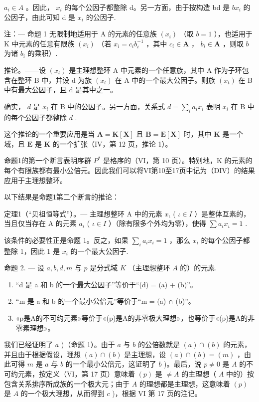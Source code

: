 \(a_{i} \in A\) 。因此， \(x_{i}\) 的每个公因子都整除 d。另一方面，由于按构造 bd 是 \(bx_{i}\) 的公因子，由此可知 d 是 \(x_{i}\) 的公因子.

注：--- 命题 1 无限制地适用于 A 的元素的任意族 \((x_{i})\) （取 \(b = 1\) ），也适用于 K 中元素的任意有限族 \((x_{i})\) （若 \(x_{i} = c_{i}b_{i}^{-1}\) ，其中 \(c_{i} \in \mathbf{A}\) ， \(b_{i} \in \mathbf{A}\) ，则取 \(b\) 为诸 \(b_{i}\) 的乘积）.

推论。——设 \((x_{t})\) 是主理想整环 A 中元素的一个任意族，其中 A 作为子环包含在整环 B 中，并设 d 为族 \((x_{t})\) 在 A 中的一个最大公因子。则族 \((x_{t})\) 在 B 中有最大公因子，且 d 是其中之一。

确实， \(d\) 是 \(x_{i}\) 在 B 中的公因子。另一方面，关系式 \(d = \sum_{i} a_{i} x_{i}\) 表明 \(x_{i}\) 在 B 中的每个公因子都整除 \(d\) .

这个推论的一个重要应用是当 \(\mathbf{A} = \mathbf{K}[\mathbf{X}]\) 且 \(\mathbf{B} = \mathbf{E}[\mathbf{X}]\) 时，其中 \(\mathbf{K}\) 是一个域，且 \(\mathbf{E}\) 是 \(\mathbf{K}\) 的一个扩张（IV，第 12 页，推论 1）。

命题1的第一个断言表明序群 \(P^{*}\) 是格序的（VI，第 10 页）。特别地，K 的元素的每个有限族都有最小公倍元。因此我们可以将VI第10至17页中记为（DIV）的结果应用于主理想整环。

以下结果是命题1第二个断言的推论：

定理1（“贝祖恒等式”）。--- 主理想整环 A 中的元素 \(x_{\iota}\) ( \(\iota \in I\) ）是整体互素的，当且仅当存在 A 的元素 \(a_{\iota}\) ( \(\iota \in I\) ）（除有限多个外均为零），使得 \(\sum a_{\iota}x_{\iota} = 1\) .

该条件的必要性正是命题 1。反之，如果 \(\sum_{i} a_i x_i = 1\) ，那么 \(x_i\) 的每个公因子都整除 1，因此 1 是 \(x_i\) 的一个最大公因子.

命题 2. --- 设 \(a, b, d, m\) 与 \(p\) 是分式域 \(K\) （主理想整环 \(A\) 的）的元素.

\begin{enumerate}
\def\labelenumi{\alph{enumi})}
\item
  “d 是 a 和 b 的一个最大公因子”等价于“(d) = (a) + (b)”。
\item
  “m 是 a 和 b 的一个最小公倍元”等价于“m = (a) ∩ (b)”。
\item
  «p是A的不可约元素»等价于«(p)是A的非零极大理想»，也等价于«(p)是A的非零素理想»。
\end{enumerate}

我们已经证明了 \(a\) )（命题 1）。由于 \(a\) 与 \(b\) 的公倍数就是 \((a) \cap (b)\) 的元素，并且由于根据假设，理想 \((a) \cap (b)\) 是主理想，设 \((a) \cap (b) = (m)\) ，由此可得 \(m\) 是 \(a\) 与 \(b\) 的一个最小公倍元，这证明了 \(b\) )。最后，说 \(p \neq 0\) 是 \(A\) 的不可约元素，按定义（VI，第 17 页）意味着 \((p)\) 是 \(\neq A\) 的主理想（ \(A\) 中的）按包含关系排序所成族的一个极大元；由于 \(A\) 的理想都是主理想，这意味着 \((p)\) 是 \(A\) 的一个极大理想，从而得到 \(c\) )，根据 VI 第 17 页的注记。

